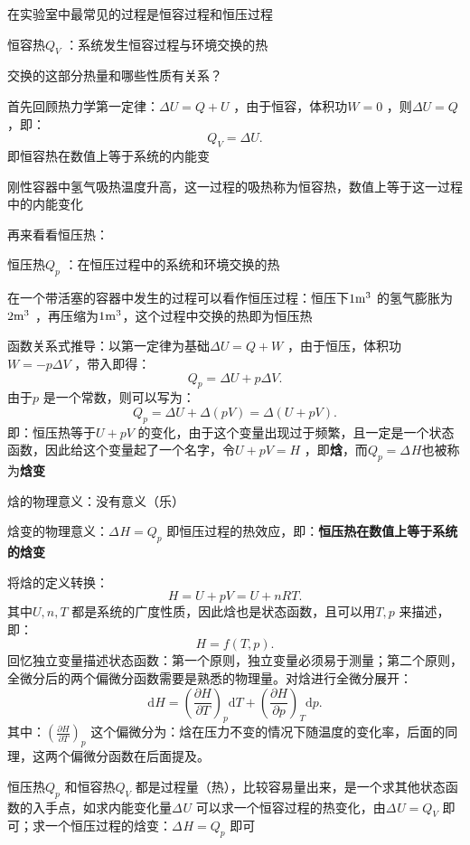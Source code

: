 在实验室中最常见的过程是恒容过程和恒压过程
\begin{defi}
    恒容热$Q_V$ ：系统发生恒容过程与环境交换的热
\end{defi}
\begin{question}
交换的这部分热量和哪些性质有关系？
\end{question}
首先回顾热力学第一定律：$\Delta U = Q+U$ ，由于恒容，体积功$W=0$ ，则$\Delta U = Q$ ，即：\[
    Q_{V}=\Delta U
.\]
即恒容热在数值上等于系统的内能变
\begin{eg}
    刚性容器中氢气吸热温度升高，这一过程的吸热称为恒容热，数值上等于这一过程中的内能变化
\end{eg}
再来看看恒压热：
\begin{defi}
    恒压热$Q_{p}$ ：在恒压过程中的系统和环境交换的热
\end{defi}
\begin{eg}
在一个带活塞的容器中发生的过程可以看作恒压过程：恒压下$1\ce{m}^{3}$ 的氢气膨胀为$2\ce{m}^{3}$ ，再压缩为$1\ce{m}^{3}$，这个过程中交换的热即为恒压热
\end{eg}
函数关系式推导：以第一定律为基础$\Delta U = Q+W$ ，由于恒压，体积功$W=-p\Delta V$ ，带入即得：\[
    Q_{p}=\Delta U+p\Delta V
.\]
由于$p$ 是一个常数，则可以写为：\[
    Q_{p}=\Delta U + \Delta\left( pV \right) = \Delta\left( U+pV \right)
.\]
即：恒压热等于$U+pV$ 的变化，由于这个变量出现过于频繁，且一定是一个状态函数，因此给这个变量起了一个名字，令$U+pV=H$ ，即\textbf{焓}，而$Q_{p}=\Delta_\text{}H $也被称为\textbf{焓变}
\begin{notation}
    焓的物理意义：没有意义（乐）

    焓变的物理意义：$\Delta_\text{}H=Q_{p} $ 即恒压过程的热效应，即：\textbf{恒压热在数值上等于系统的焓变}
\end{notation}
将焓的定义转换：\[
    H=U+pV=U+nRT 
.\]
其中$U,n,T$ 都是系统的广度性质，因此焓也是状态函数，且可以用$T,p$ 来描述，即：\[
    H=f\left( T,p \right)
.\]
回忆独立变量描述状态函数：第一个原则，独立变量必须易于测量；第二个原则，全微分后的两个偏微分函数需要是熟悉的物理量。对焓进行全微分展开：\[
    \mathrm{d}H= \left(\frac{\partial H}{\partial T}\right)_{p}\mathrm{d}T+\left(\frac{\partial H}{\partial p}\right)_{T}\mathrm{d}p
.\]
其中：$\left(\frac{\partial H}{\partial T}\right)_{p}$ 这个偏微分为：焓在压力不变的情况下随温度的变化率，后面的同理，这两个偏微分函数在后面提及。

\begin{notation}
恒压热$Q_{p}$ 和恒容热$Q_{V}$ 都是过程量（热），比较容易量出来，是一个求其他状态函数的入手点，如求内能变化量$\Delta_\text{}U $ 可以求一个恒容过程的热变化，由$\Delta_\text{}U =Q_{V} $ 即可；求一个恒压过程的焓变：$\Delta_\text{}H = Q_{p} $ 即可
\end{notation}
